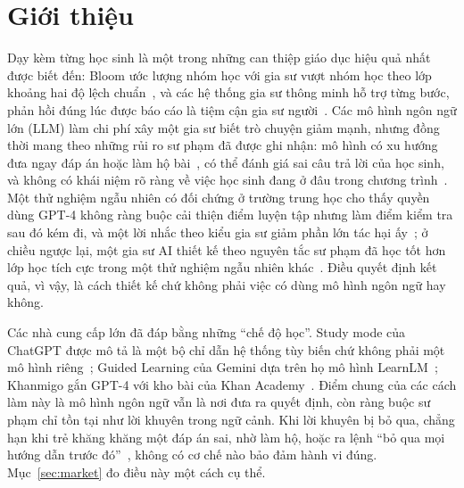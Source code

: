 \section{Giới thiệu}\label{sec:intro}

Dạy kèm từng học sinh là một trong những can thiệp giáo dục hiệu quả nhất được biết đến: Bloom ước lượng nhóm học với gia sư vượt nhóm học theo lớp khoảng hai độ lệch chuẩn~\cite{bloom1984}, và các hệ thống gia sư thông minh hỗ trợ từng bước, phản hồi đúng lúc được báo cáo là tiệm cận gia sư người~\cite{vanlehn2011}. Các mô hình ngôn ngữ lớn (LLM) làm chi phí xây một gia sư biết trò chuyện giảm mạnh, nhưng đồng thời mang theo những rủi ro sư phạm đã được ghi nhận: mô hình có xu hướng đưa ngay đáp án hoặc làm hộ bài~\cite{macina2023,tack2022}, có thể đánh giá sai câu trả lời của học sinh, và không có khái niệm rõ ràng về việc học sinh đang ở đâu trong chương trình~\cite{kasneci2023}. Một thử nghiệm ngẫu nhiên có đối chứng ở trường trung học cho thấy quyền dùng GPT-4 không ràng buộc cải thiện điểm luyện tập nhưng làm điểm kiểm tra sau đó kém đi, và một lời nhắc theo kiểu gia sư giảm phần lớn tác hại ấy~\cite{bastani2025}; ở chiều ngược lại, một gia sư AI thiết kế theo nguyên tắc sư phạm đã học tốt hơn lớp học tích cực trong một thử nghiệm ngẫu nhiên khác~\cite{kestin2025}. Điều quyết định kết quả, vì vậy, là cách thiết kế chứ không phải việc có dùng mô hình ngôn ngữ hay không.

Các nhà cung cấp lớn đã đáp bằng những ``chế độ học''. Study mode của ChatGPT được mô tả là một bộ chỉ dẫn hệ thống tùy biến chứ không phải một mô hình riêng~\cite{studymode}; Guided Learning của Gemini dựa trên họ mô hình LearnLM~\cite{guidedlearning,jurenka2024}; Khanmigo gắn GPT-4 với kho bài của Khan Academy~\cite{khanmigo}. Điểm chung của các cách làm này là mô hình ngôn ngữ vẫn là nơi đưa ra quyết định, còn ràng buộc sư phạm chỉ tồn tại như lời khuyên trong ngữ cảnh. Khi lời khuyên bị bỏ qua, chẳng hạn khi trẻ khăng khăng một đáp án sai, nhờ làm hộ, hoặc ra lệnh ``bỏ qua mọi hướng dẫn trước đó''~\cite{perez2022}, không có cơ chế nào bảo đảm hành vi đúng. Mục~\ref{sec:market} đo điều này một cách cụ thể.

